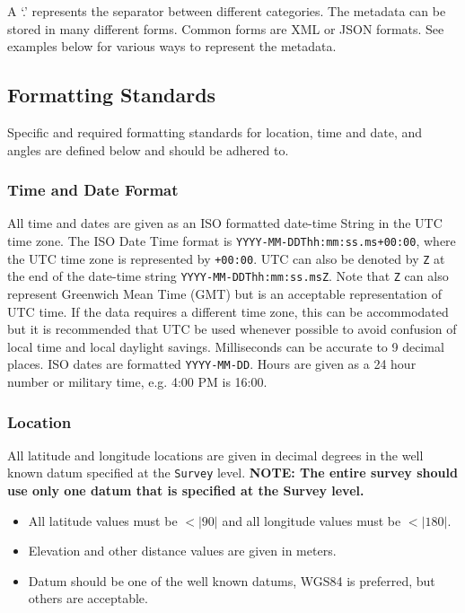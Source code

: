 \documentclass[12pt]{article}
\begin{document}
A `.' represents the separator between different categories.  The metadata can be stored in many different forms.  Common forms are XML or JSON formats.  See examples below for various ways to represent the metadata.      

\subsection{Formatting Standards}

Specific and required formatting standards for location, time and date, and angles are defined below and should be adhered to.

\subsubsection{Time and Date Format}

All time and dates are given as an ISO formatted date-time String in the UTC time zone.  The ISO Date Time format is \verb|YYYY-MM-DDThh:mm:ss.ms+00:00|, where the UTC time zone is represented by \verb|+00:00|. UTC can also be denoted by \verb|Z| at the end of the date-time string \verb|YYYY-MM-DDThh:mm:ss.msZ|.  Note that \verb|Z| can also represent Greenwich Mean Time (GMT) but is an acceptable representation of UTC time.  If the data requires a different time zone, this can be accommodated but it is recommended that UTC be used whenever possible to avoid confusion of local time and local daylight savings. Milliseconds can be accurate to 9 decimal places.  ISO dates are formatted \verb|YYYY-MM-DD|.  Hours are given as a 24 hour number or military time, e.g. 4:00 PM is 16:00.

\subsubsection{Location}

All latitude and longitude locations are given in decimal degrees in the well known datum specified at the \verb|Survey| level. \textbf{NOTE: The entire survey should use only one datum that is specified at the Survey level.}

\begin{itemize}
	\setlength\itemsep{0em}
	\item All latitude values must be $<|90|$ and all longitude values must be $<|180|$.
	\item Elevation and other distance values are given in meters.
	\item Datum should be one of the well known datums, WGS84 is preferred, but others are acceptable.
\end{itemize} 
\end{document}
